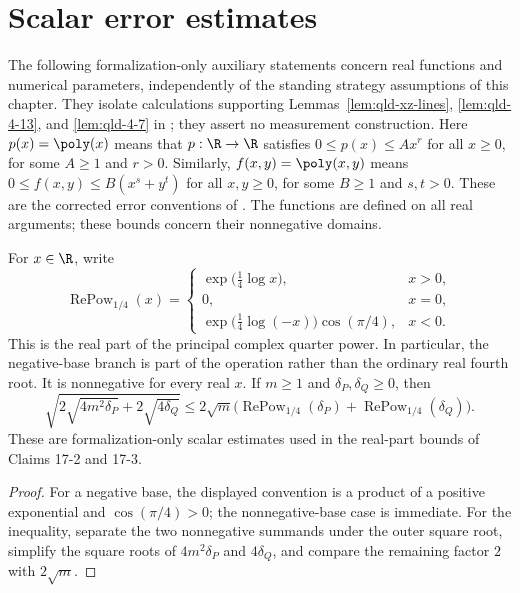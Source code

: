 \section{Scalar error estimates}

The following formalization-only auxiliary statements concern real
functions and numerical parameters, independently of the standing strategy
assumptions of this chapter. They isolate calculations supporting
Lemmas~\ref{lem:qld-xz-lines}, \ref{lem:qld-4-13}, and \ref{lem:qld-4-7}
in \cite{Ji2020MIPStar}; they assert no measurement construction.
Here $p(x)=\poly(x)$ means that $p:\R\to\R$ satisfies
$0\le p(x)\le A x^r$ for all $x\ge0$, for some $A\ge1$ and $r>0$.
Similarly, $f(x,y)=\poly(x,y)$ means
$0\le f(x,y)\le B(x^s+y^t)$ for all $x,y\ge0$, for some $B\ge1$ and
$s,t>0$. These are the corrected error conventions of
\cite{gap:qpbt_polynomial-error-square-root,gap:qpbt_pasting-product-error}.
The functions are defined on all real arguments; these bounds concern their
nonnegative domains.

\begin{theorem}
	\label{thm:qld-quarter-power-deficit-bound}
	\leanok
	For $x\in\R$, write
	\[
	 \operatorname{RePow}_{1/4}(x)=
	 \begin{cases}
	  \exp\bigl(\frac14\log x\bigr),&x>0,\\
	  0,&x=0,\\
	  \exp\bigl(\frac14\log(-x)\bigr)\cos(\pi/4),&x<0.
	 \end{cases}
	\]
	This is the real part of the principal complex quarter power. In particular,
	the negative-base branch is part of the operation rather than the ordinary
	real fourth root. It is nonnegative for every real $x$.
	If $m\geq1$ and $\delta_P,\delta_Q\geq0$, then
	\[
	 \sqrt{2\sqrt{4m^2\delta_P}+2\sqrt{4\delta_Q}}
	 \leq2\sqrt m\bigl(
	  \operatorname{RePow}_{1/4}(\delta_P)
	  +\operatorname{RePow}_{1/4}(\delta_Q)\bigr).
	\]
	These are formalization-only scalar estimates used in the real-part bounds
	of Claims 17-2 and 17-3.
\end{theorem}
\begin{proof}
	\leanok
	For a negative base, the displayed convention is a product of a positive
	exponential and $\cos(\pi/4)>0$; the nonnegative-base case is immediate.
	For the inequality, separate the two nonnegative summands under the outer
	square root, simplify the square roots of $4m^2\delta_P$ and $4\delta_Q$,
	and compare the remaining factor $2$ with $2\sqrt m$.
\end{proof}

